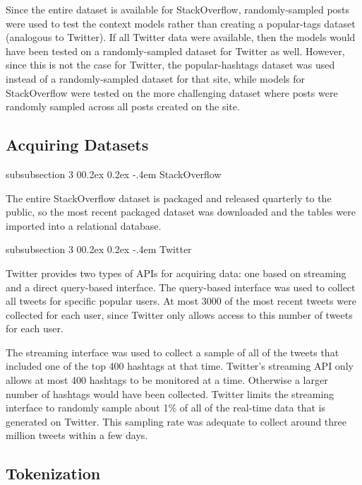\documentclass[man,floatsintext,donotrepeattitle]{apa6}
\makeatletter
\renewcommand{\subsubsection}{%
  \@startsection
  {subsubsection}%
  {3}%
  {\parindent}%
  {0\baselineskip \@plus 0.2ex \@minus 0.2ex}%
  {-.4em}%
  {\normalfont\normalsize\bfseries\addperi}}
\makeatother
\begin{document}
Since the entire dataset is available for StackOverflow, randomly-sampled posts were used to test the context models rather than creating a popular-tags dataset (analogous to Twitter).
If all Twitter data were available, then the models would have been tested on a randomly-sampled dataset for Twitter as well.
However, since this is not the case for Twitter, the popular-hashtags dataset was used instead of a randomly-sampled dataset for that site,
while models for StackOverflow were tested on the more challenging dataset where posts were randomly sampled across all posts created on the site.

\subsection{Acquiring Datasets}

\subsubsection{StackOverflow}

The entire StackOverflow dataset is packaged and released quarterly to the public,
so the most recent packaged dataset was downloaded and the tables were imported into a relational database.

\subsubsection{Twitter}

Twitter provides two types of APIs for acquiring data: one based on streaming and a direct query-based interface.
The query-based interface was used to collect all tweets for specific popular users.
At most \num{3000} of the most recent tweets were collected for each user, since Twitter only allows access to this number of tweets for each user.

The streaming interface was used to collect a sample of all of the tweets that included one of the top 400 hashtags at that time.
Twitter's streaming API only allows at most 400 hashtags to be monitored at a time.
Otherwise a larger number of hashtags would have been collected.
Twitter limits the streaming interface to randomly sample about 1\% of all of the real-time data that is generated on Twitter.
This sampling rate was adequate to collect around three million tweets within a few days.

\subsection{Tokenization}
\end{document}
